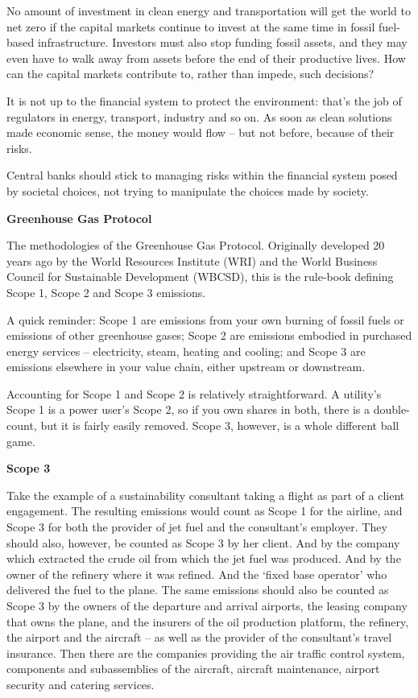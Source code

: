 \documentclass[
]{book}
\begin{document}
No amount of investment in clean energy and transportation will get the world to net zero if the capital markets continue to invest at the same time in fossil fuel-based infrastructure. Investors must also stop funding fossil assets, and they may even have to walk away from assets before the end of their productive lives. How can the capital markets contribute to, rather than impede, such decisions?

It is not up to the financial system to protect the environment:
that's the job of regulators in energy, transport, industry and so on.
As soon as clean solutions made economic sense, the money would flow --
but not before, because of their risks.

Central banks should stick to managing risks within the financial system posed by societal choices, not trying to manipulate the choices made by society.

\textbf{Greenhouse Gas Protocol}

The methodologies of the Greenhouse Gas Protocol. Originally developed 20 years ago by the World Resources Institute (WRI) and the World Business Council for Sustainable Development (WBCSD), this is the rule-book defining Scope 1, Scope 2 and Scope 3 emissions.

A quick reminder: Scope 1 are emissions from your own burning of fossil fuels or emissions of other greenhouse gases; Scope 2 are emissions embodied in purchased energy services -- electricity, steam, heating and cooling; and Scope 3 are emissions elsewhere in your value chain, either upstream or downstream.

Accounting for Scope 1 and Scope 2 is relatively straightforward. A utility's Scope 1 is a power user's Scope 2, so if you own shares in both, there is a double-count, but it is fairly easily removed. Scope 3, however, is a whole different ball game.

\textbf{Scope 3}

Take the example of a sustainability consultant taking a flight as part of a client engagement. The resulting emissions would count as Scope 1 for the airline, and Scope 3 for both the provider of jet fuel and the consultant's employer. They should also, however, be counted as Scope 3 by her client. And by the company which extracted the crude oil from which the jet fuel was produced. And by the owner of the refinery where it was refined. And the `fixed base operator' who delivered the fuel to the plane. The same emissions should also be counted as Scope 3 by the owners of the departure and arrival airports, the leasing company that owns the plane, and the insurers of the oil production platform, the refinery, the airport and the aircraft -- as well as the provider of the consultant's travel insurance. Then there are the companies providing the air traffic control system, components and subassemblies of the aircraft, aircraft maintenance, airport security and catering services.
\end{document}
